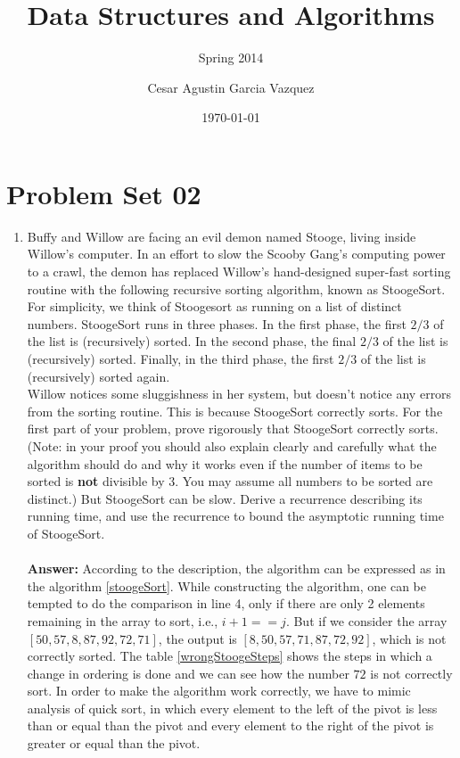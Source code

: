 \documentclass[12pt]{scrartcl}
\title{Data Structures and Algorithms}
\subtitle{Spring 2014}
\author{Cesar Agustin Garcia Vazquez}
\date{\today}                                           %
\begin{document}
\maketitle
\section{Problem Set 02}

\begin{enumerate}
	\item Buffy and Willow are facing an evil demon named Stooge, living inside Willow's computer. In an effort to slow the Scooby Gang's computing power to a crawl, the demon has replaced Willow's hand-designed super-fast sorting routine with the following recursive sorting algorithm, known as StoogeSort. For simplicity, we think of Stoogesort as running on a list of distinct numbers. StoogeSort runs in three phases. In the first phase, the first $2/3$ of the list is (recursively) sorted. In the second phase, the final $2/3$ of the list is (recursively) sorted. Finally, in the third phase, the first $2/3$ of the list is (recursively) sorted again.\\
	Willow notices some sluggishness in her system, but doesn't notice any errors from the sorting routine. This is because StoogeSort correctly sorts. For the first part of your problem, prove rigorously that StoogeSort correctly sorts. (Note: in your proof you should also explain clearly and carefully what the algorithm should do and why it works even if the number of items to be sorted is \textbf{not} divisible by $3$. You may assume all numbers to be sorted are distinct.) But StoogeSort can be slow. Derive a recurrence describing its running time, and use the recurrence to bound the asymptotic running time of StoogeSort.\\
	\\
	\textbf{Answer: } According to the description, the algorithm can be expressed as in the algorithm \ref{stoogeSort}. While constructing the algorithm, one can be tempted to do the comparison in line 4, only if there are only 2 elements remaining in the array to sort, i.e., $i + 1 == j$. But if we consider the array $[50,  57, 8, 87, 92, 72, 71 ]$, the output is $[8, 50, 57, 71, 87, 72, 92 ]$, which is not correctly sorted. The table \ref{wrongStoogeSteps} shows the steps in which a change in ordering is done and we can see how the number $72$ is not correctly sort. In order to make the algorithm work correctly, we have to mimic analysis of quick sort, in which every element to the left of the pivot is less than or equal than the pivot and every element to the right of the pivot is greater or equal than the pivot. \\

\end{enumerate}
\end{document}
